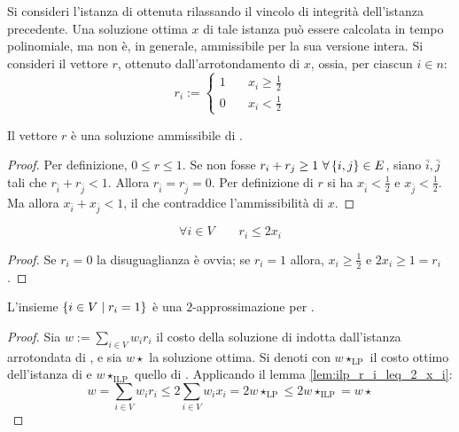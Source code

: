 Si consideri l'istanza di \LinearProgramming ottenuta rilassando il vincolo di integrità dell'istanza precedente.
Una soluzione ottima $x$ di tale istanza può essere calcolata in tempo polinomiale, ma non è, in generale, ammissibile per la sua versione intera.
Si consideri il vettore $r$, ottenuto dall'arrotondamento di $x$, ossia, per ciascun $i\in n$:
\begin{equation*}
	r_i:= \begin{cases}
		1 & \quad x_i\geq\frac{1}{2} \\
		0 & \quad x_i<\frac{1}{2}
	\end{cases}
\end{equation*}

\begin{lemma}\label{lem:ilp_r_ammiss}
	Il vettore $r$ è una soluzione ammissibile di \IntegerLinearProgramming.
\end{lemma}
\begin{proof}
	Per definizione, $0\leq r\leq 1$. Se non fosse $r_i+r_j\geq 1~\forall \left\{ i,j \right\}\in E$, siano $\bar i,\bar j$ tali che $r_{\bar i}+r_{\bar j}<1$.
	Allora $r_{\bar i}=r_{\bar j}=0$. Per definizione di $r$ si ha $x_{\bar i}<\frac 12$ e $x_{\bar j}<\frac 12$.
	Ma allora $x_{\bar i}+x_{\bar j}<1$, il che contraddice l'ammissibilità di $x$.
\end{proof}

\begin{lemma}\label{lem:ilp_r_i_leq_2_x_i}
	\begin{equation*}
		\forall i\in V \qquad r_i \leq 2x_i
	\end{equation*}
\end{lemma}
\begin{proof}
	Se $r_i=0$ la disuguaglianza è ovvia;
	se $r_i=1$ allora, $x_i\geq \frac 12$ e $2x_i\geq 1=r_i$.
\end{proof}

\begin{theorem}\label{lem:ilp_appr}
	L'insieme $\left\{ i\in V\mid r_i=1 \right\}$ è una $2$-approssimazione per \VertexCover.
\end{theorem}
\begin{proof}
	Sia $w:=\sum_{i\in V} w_i r_i$ il costo della soluzione di \VertexCover indotta dall'istanza arrotondata di \LinearProgramming, e sia $w\star$ la soluzione ottima. Si denoti con $w\star_{\text{LP}}$ il costo ottimo dell'istanza di \LinearProgramming e $w\star_{\text{ILP}}$ quello di \IntegerLinearProgramming.
	Applicando il lemma \ref{lem:ilp_r_i_leq_2_x_i}:
	\begin{equation*}
		w = \sum_{i\in V} w_i r_i \leq 2\sum_{i\in V} w_i x_i = 2w\star_{\text{LP}} \leq 2w\star_{\text{ILP}} = w\star
	\end{equation*}
\end{proof}





